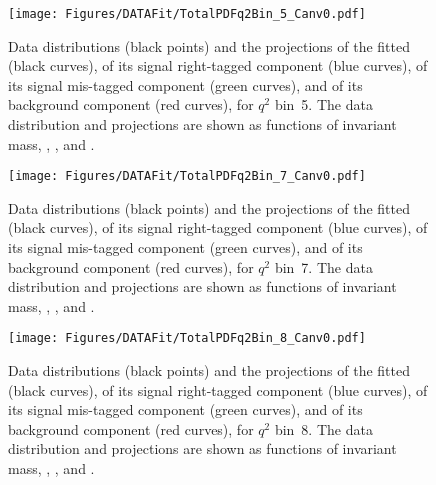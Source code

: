 \begin{figure}[!hbtp]
  \centering
  \texttt{[image: Figures/DATAFit/TotalPDFq2Bin\_5\_Canv0.pdf]}
  \caption{Data distributions (black points) and the projections of the fitted \pdf (black curves), of its signal right-tagged component (blue curves), of its signal mis-tagged component (green curves), and of its background component (red curves), for $q^2$ bin~5.
    The data distribution and \pdf projections are shown as functions of \PBz invariant mass, \cTL, \cTK, and \PHI.}
  \label{fig:res_bin5}
\end{figure}

\begin{figure}
  \centering
  \texttt{[image: Figures/DATAFit/TotalPDFq2Bin\_7\_Canv0.pdf]}
  \caption{Data distributions (black points) and the projections of the fitted \pdf (black curves), of its signal right-tagged component (blue curves), of its signal mis-tagged component (green curves), and of its background component (red curves), for $q^2$ bin~7.
    The data distribution and \pdf projections are shown as functions of \PBz invariant mass, \cTL, \cTK, and \PHI.}
  \label{fig:res_bin7}
\end{figure}

\begin{figure}
  \centering
  \texttt{[image: Figures/DATAFit/TotalPDFq2Bin\_8\_Canv0.pdf]}
  \caption{Data distributions (black points) and the projections of the fitted \pdf (black curves), of its signal right-tagged component (blue curves), of its signal mis-tagged component (green curves), and of its background component (red curves), for $q^2$ bin~8.
    The data distribution and \pdf projections are shown as functions of \PBz invariant mass, \cTL, \cTK, and \PHI.}
  \label{fig:res_bin8}
\end{figure}
